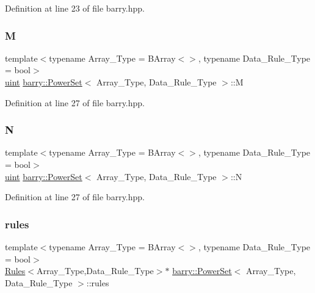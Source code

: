 Definition at line 23 of file barry.\+hpp.

\mbox{\label{classbarry_1_1_power_set_ae64182a21f9969a2c9fdf73ab23a6c5e}} 
\subsubsection{\texorpdfstring{M}{M}}
{\footnotesize\ttfamily template$<$typename Array\+\_\+\+Type  = B\+Array$<$$>$, typename Data\+\_\+\+Rule\+\_\+\+Type  = bool$>$ \\
\hyperlink{namespacebarry_a11dfc53ddb4672278319aa04f1e09a6c}{uint} \hyperlink{classbarry_1_1_power_set}{barry\+::\+Power\+Set}$<$ Array\+\_\+\+Type, Data\+\_\+\+Rule\+\_\+\+Type $>$\+::M}



Definition at line 27 of file barry.\+hpp.

\mbox{\label{classbarry_1_1_power_set_adea0f6434b17b3fc391475a11db00c2f}} 
\subsubsection{\texorpdfstring{N}{N}}
{\footnotesize\ttfamily template$<$typename Array\+\_\+\+Type  = B\+Array$<$$>$, typename Data\+\_\+\+Rule\+\_\+\+Type  = bool$>$ \\
\hyperlink{namespacebarry_a11dfc53ddb4672278319aa04f1e09a6c}{uint} \hyperlink{classbarry_1_1_power_set}{barry\+::\+Power\+Set}$<$ Array\+\_\+\+Type, Data\+\_\+\+Rule\+\_\+\+Type $>$\+::N}



Definition at line 27 of file barry.\+hpp.

\mbox{\label{classbarry_1_1_power_set_ae8eee09092e96fbefde320ba89fdcbfc}} 
\subsubsection{\texorpdfstring{rules}{rules}}
{\footnotesize\ttfamily template$<$typename Array\+\_\+\+Type  = B\+Array$<$$>$, typename Data\+\_\+\+Rule\+\_\+\+Type  = bool$>$ \\
\hyperlink{classbarry_1_1_rules}{Rules}$<$Array\+\_\+\+Type,Data\+\_\+\+Rule\+\_\+\+Type$>$$\ast$ \hyperlink{classbarry_1_1_power_set}{barry\+::\+Power\+Set}$<$ Array\+\_\+\+Type, Data\+\_\+\+Rule\+\_\+\+Type $>$\+::rules}



